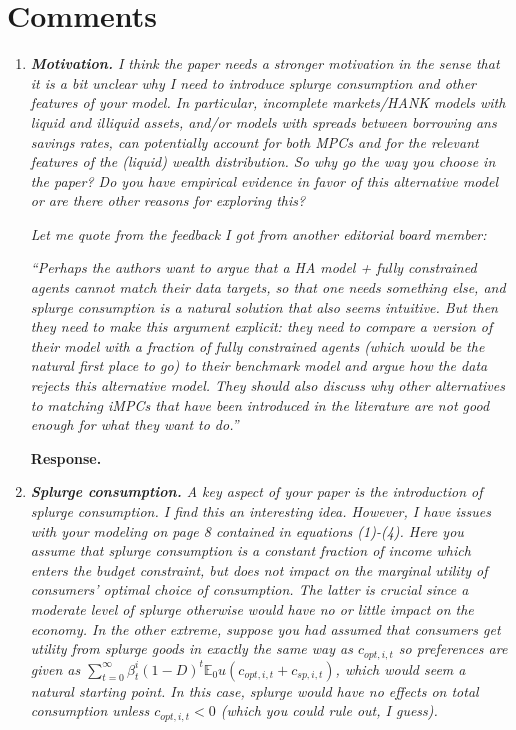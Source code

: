 \documentclass[12pt,letterpaper,english]{article}
\begin{document}
\section{Comments}
\begin{enumerate}
	
\item \textit{\textbf{Motivation.} I think the paper needs a stronger motivation in the sense that it is a bit unclear why I need to introduce splurge consumption and other features of your model. In particular, incomplete markets/HANK models with liquid and	illiquid assets, and/or models with spreads between borrowing ans savings rates, can potentially account for both MPCs and for the relevant features of the (liquid)	wealth distribution. So why go the way you choose in the paper? Do you have empirical evidence in favor of this alternative model or are there other reasons for exploring this?}

\textit{Let me quote from the feedback I got from another editorial board member:}

\textit{``Perhaps the authors want to argue that a HA model + fully constrained agents	cannot match their data targets, so that one needs something else, and splurge	consumption is a natural solution that also seems intuitive. But then they need to make this argument explicit: they need to compare a version of their model with a fraction of fully constrained agents (which would be the natural first place to go)	to their benchmark model and argue how the data rejects this alternative model. They should also discuss why other alternatives to matching iMPCs that have been	introduced in the literature are not good enough for what they want to do.''}	

\noindent \textbf{Response.} 

\item \textit{\textbf{Splurge consumption.} A key aspect of your paper is the introduction of splurge consumption. I find this an interesting idea. However, I have issues with your modeling on page 8 contained in equations (1)-(4). Here you assume that	splurge  consumption is a constant fraction of income which enters the budget constraint, but does not impact on the marginal utility of consumers' optimal choice of consumption. The latter is crucial since a moderate level of splurge otherwise would have no or little impact on the economy. In the other extreme, suppose you had assumed that consumers get utility from splurge goods in exactly the same way as $c_{opt,i,t}$ so preferences are given as $\sum_{t=0}^{\infty} \beta^i_t (1 - D)^{t} \mathbb{E}_0 u(c_{opt,i,t} + c_{sp,i,t})$, which would seem a natural starting point. In this case, splurge would have no effects on total consumption unless $c_{opt,i,t} < 0$ (which you could rule out, I guess).} 


\end{enumerate}
\end{document}
